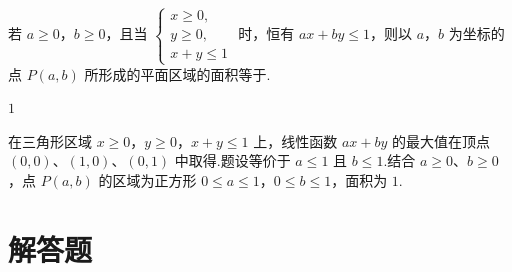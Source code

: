 \begin{problem}
若 \(a \geqslant 0\)，\(b \geqslant 0\)，且当 \(\begin{cases}
x \geqslant 0,\\
y \geqslant 0,\\
x + y \leqslant 1
\end{cases}\) 时，恒有 \(ax + by \leqslant 1\)，则以 \(a\)，\(b\) 为坐标的点 \(P(a, b)\) 所形成的平面区域的面积等于\fillinblank{}.
\end{problem}

\begin{answer}
\(1\)
\end{answer}

\begin{solution}
在三角形区域 \(x\geqslant0\)，\(y\geqslant0\)，\(x+y\leqslant1\) 上，线性函数 \(ax+by\) 的最大值在顶点
\((0,0)\)、\((1,0)\)、\((0,1)\) 中取得.题设等价于
\(a\leqslant1\) 且 \(b\leqslant1\).结合 \(a\geqslant0\)、\(b\geqslant0\)，点 \(P(a,b)\) 的区域为正方形
\(0\leqslant a\leqslant1\)，\(0\leqslant b\leqslant1\)，面积为 \(1\).
\end{solution}

\section{解答题}

